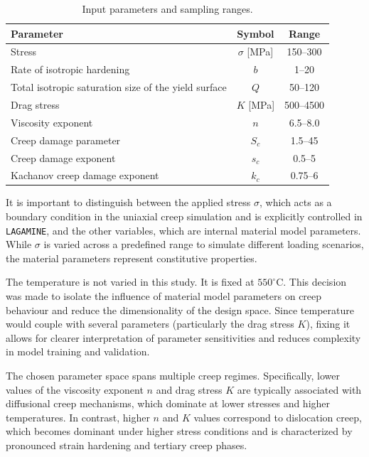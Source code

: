 \documentclass[class=scrbook, crop=false]{standalone}
\begin{document}
	\begin{table}[H]
		\centering
		\caption{Input parameters and sampling ranges.}
		\label{tab:param_ranges}
		\begin{tabular}{lcc}
			\toprule
			\textbf{Parameter} & \textbf{Symbol} & \textbf{Range} \\
			\midrule
			Stress & $\sigma$ [MPa] & 150–300 \\
			Rate of isotropic hardening  & $b$ & 1–20 \\
			Total isotropic saturation size of the yield surface & $Q$ & 50–120 \\
			Drag stress & $K$ [MPa]& 500–4500 \\
			Viscosity exponent & $n$ & 6.5–8.0 \\
			Creep damage parameter & $S_c$ & 1.5–45 \\
			Creep damage exponent & $s_c$ & 0.5–5 \\
			Kachanov creep damage exponent & $k_c$ & 0.75–6 \\
			\bottomrule
		\end{tabular}
	\end{table}
	
	It is important to distinguish between the applied stress \(\sigma\), which acts as a boundary condition in the uniaxial creep simulation and is explicitly controlled in \texttt{LAGAMINE}, and the other variables, which are internal material model parameters. While \(\sigma\) is varied across a predefined range to simulate different loading scenarios, the material parameters represent constitutive properties.
	
	The temperature is not varied in this study. It is fixed at $550^\circ\text{C}$. This decision was made to isolate the influence of material model parameters on creep behaviour and reduce the dimensionality of the design space. Since temperature would couple with several parameters (particularly the drag stress \( K \)), fixing it allows for clearer interpretation of parameter sensitivities and reduces complexity in model training and validation.
	
	The chosen parameter space spans multiple creep regimes. Specifically, lower values of the viscosity exponent \( n \) and drag stress \( K \) are typically associated with diffusional creep mechanisms, which dominate at lower stresses and higher temperatures. In contrast, higher \( n \) and \( K \) values correspond to dislocation creep, which becomes dominant under higher stress conditions and is characterized by pronounced strain hardening and tertiary creep phases.
	
\end{document}
